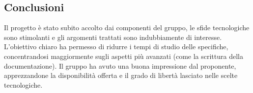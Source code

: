 \documentclass[../studio-di-fattibilita.tex]{subfiles}
\begin{document}
	\subsection{Conclusioni}
	\label{subsec:conclusioni}
	Il progetto è stato subito accolto dai componenti del gruppo, le sfide tecnologiche sono stimolanti e gli argomenti trattati sono indubbiamente di interesse. L'obiettivo chiaro ha permesso di ridurre i tempi di studio delle specifiche, concentrandosi maggiormente sugli aspetti più avanzati (come la scrittura della documentazione). Il gruppo ha avuto una buona impressione dal proponente, apprezzandone la disponibilità offerta e il grado di libertà lasciato nelle scelte tecnologiche.
	
\end{document}
